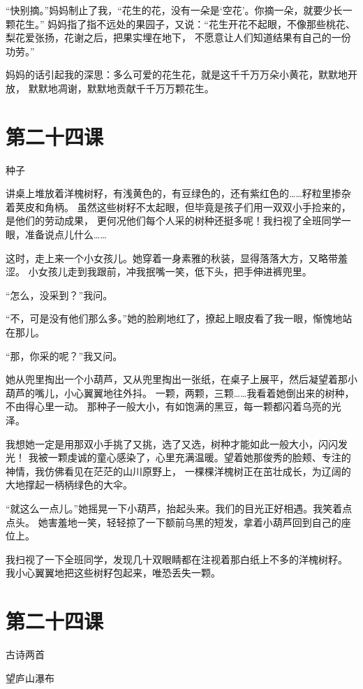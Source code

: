 \documentclass[12pt,UTF8]{ctexbook}
\begin{document}
“快别摘。”妈妈制止了我，“花生的花，没有一朵是‘空花’。你摘一朵，就要少长一颗花生。”
妈妈指了指不远处的果园子，又说：“花生开花不起眼，不像那些桃花、梨花爱张扬，花谢之后，把果实埋在地下，
不愿意让人们知道结果有自己的一份功劳。”

妈妈的话引起我的深思：多么可爱的花生花，就是这千千万万朵小黄花，默默地开放，
默默地凋谢，默默地贡献千千万万颗花生。

\section{第二十四课}

种子

讲桌上堆放着洋槐树籽，有浅黄色的，有豆绿色的，还有紫红色的……籽粒里掺杂着荚皮和角柄。
虽然这些树籽不太起眼，但毕竟是孩子们用一双双小手捡来的，是他们的劳动成果，
更何况他们每个人采的树种还挺多呢！我扫视了全班同学一眼，准备说点儿什么……

这时，走上来一个小女孩儿。她穿着一身素雅的秋装，显得落落大方，又略带羞涩。
小女孩儿走到我跟前，冲我抿嘴一笑，低下头，把手伸进裤兜里。

“怎么，没采到？”我问。

“不，可是没有他们那么多。”她的脸刷地红了，撩起上眼皮看了我一眼，惭愧地站在那儿。

“那，你采的呢？”我又问。

她从兜里掏出一个小葫芦，又从兜里掏出一张纸，在桌子上展平，然后凝望着那小葫芦的嘴儿，小心翼翼地往外抖。
一颗，两颗，三颗……我看着她倒出来的树种，不由得心里一动。
那种子一般大小，有如饱满的黑豆，每一颗都闪着乌亮的光泽。

我想她一定是用那双小手挑了又挑，选了又选，树种才能如此一般大小，闪闪发光！
我被一颗虔诚的童心感染了，心里充满温暖。望着她那俊秀的脸颊、专注的神情，我仿佛看见在茫茫的山川原野上，
一棵棵洋槐树正在茁壮成长，为辽阔的大地撑起一柄柄绿色的大伞。

“就这么一点儿。”她摇晃一下小葫芦，抬起头来。我们的目光正好相遇。我笑着点点头。
她害羞地一笑，轻轻掠了一下额前乌黑的短发，拿着小葫芦回到自己的座位上。

我扫视了一下全班同学，发现几十双眼睛都在注视着那白纸上不多的洋槐树籽。
我小心翼翼地把这些树籽包起来，唯恐丢失一颗。

\section{第二十四课}

古诗两首

望庐山瀑布
\end{document}
